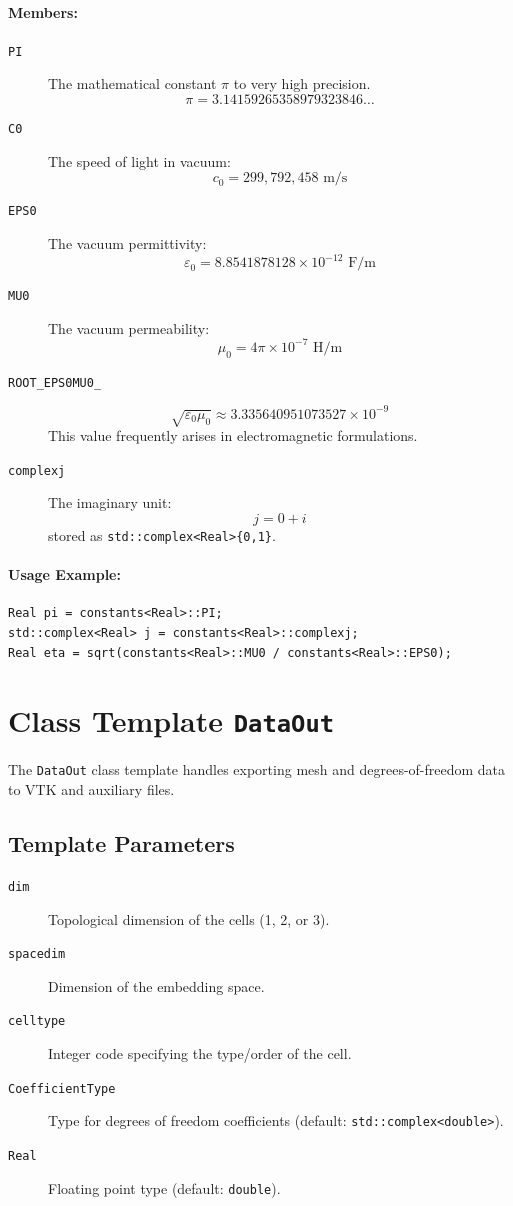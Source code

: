 \documentclass{article}
\begin{document}
\paragraph{Members:}
\begin{description}
  \item[\texttt{PI}] The mathematical constant $\pi$ to very high precision.
  \[
  \pi = 3.14159265358979323846\ldots
  \]
  \item[\texttt{C0}] The speed of light in vacuum:
  \[
  c_0 = 299,792,458 \text{ m/s}
  \]
  \item[\texttt{EPS0}] The vacuum permittivity:
  \[
  \varepsilon_0 = 8.8541878128 \times 10^{-12}\text{ F/m}
  \]
  \item[\texttt{MU0}] The vacuum permeability:
  \[
  \mu_0 = 4\pi \times 10^{-7}\text{ H/m}
  \]
  \item[\texttt{ROOT\_EPS0MU0\_}]
  \[
  \sqrt{\varepsilon_0 \mu_0} \approx 3.335640951073527 \times 10^{-9}
  \]
  This value frequently arises in electromagnetic formulations.
  \item[\texttt{complexj}]
  The imaginary unit:
  \[
  j = 0 + i
  \]
  stored as \texttt{std::complex<Real>\{0,1\}}.
\end{description}

\paragraph{Usage Example:}
\begin{verbatim}
Real pi = constants<Real>::PI;
std::complex<Real> j = constants<Real>::complexj;
Real eta = sqrt(constants<Real>::MU0 / constants<Real>::EPS0);
\end{verbatim}
\section{Class Template \texttt{DataOut}}

The \texttt{DataOut} class template handles exporting mesh and degrees-of-freedom data to VTK and auxiliary files.

\subsection*{Template Parameters}
\begin{description}
  \item[\texttt{dim}] Topological dimension of the cells (1, 2, or 3).
  \item[\texttt{spacedim}] Dimension of the embedding space.
  \item[\texttt{celltype}] Integer code specifying the type/order of the cell.
  \item[\texttt{CoefficientType}] Type for degrees of freedom coefficients (default: \texttt{std::complex<double>}).
  \item[\texttt{Real}] Floating point type (default: \texttt{double}).
\end{description}
\end{document}
